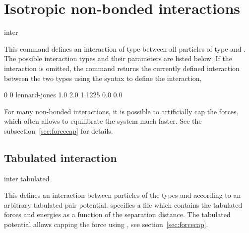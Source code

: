 \section{Isotropic non-bonded interactions}
\label{sec:inter-nb}

\begin{essyntax*}
  inter  
\end{essyntax*}
This command defines an interaction of type  between
all particles of type  and . The possible
interaction types and their parameters are listed below. If the
interaction is omitted, the command returns the currently defined
interaction between the two types using the syntax to define the
interaction, \eg
\begin{tclcode}
  0 0 lennard-jones 1.0 2.0 1.1225 0.0 0.0
\end{tclcode}

For many non-bonded interactions, it is possible to artificially cap
the forces, which often allows to equilibrate the system much
faster. See the subsection~\ref{sec:forcecap} for details.


\subsection{Tabulated interaction}
\label{sec:tabnonbonded}

\begin{essyntax}
  inter   tabulated %
  \begin{features}
  \end{features}
\end{essyntax}
\begin{pysyntax}
  \begin{features}
  \end{features}
\end{pysyntax}

This defines an interaction between particles of the types  and
 according to an arbitrary tabulated pair potential. 
specifies a file which contains the tabulated forces and energies as a function
of the separation distance. The tabulated potential allows capping the force
using , see section~\ref{sec:forcecap}.

